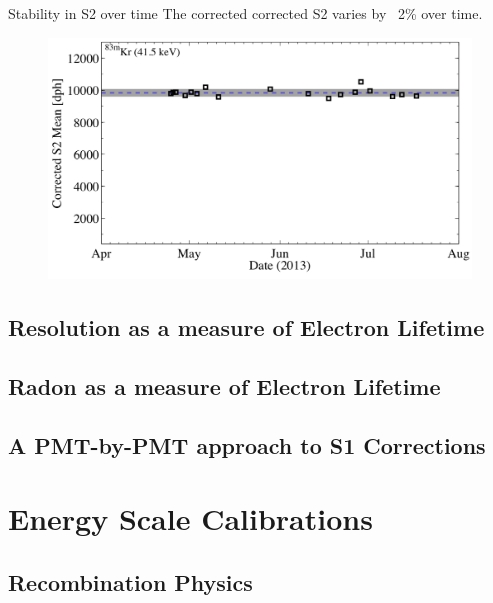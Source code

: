 \documentclass[a4paper,12pt]{article}
\begin{document}
{Stability in S2 over time  The corrected corrected S2 varies by ~2\% over time.

\begin{figure} [!h]
\includegraphics[scale=.35]{CorrectedS2_Stability.png} 
\label{KrS2Stability}
\end{figure}

\subsection{Resolution as a measure of Electron Lifetime}

\subsection{Radon as a measure of Electron Lifetime}

\subsection{A PMT-by-PMT approach to S1 Corrections}


\section{Energy Scale Calibrations} \label{CombinedEnergyModel}


\subsection{Recombination Physics} \label{RecombSec} 
}
\end{document}
